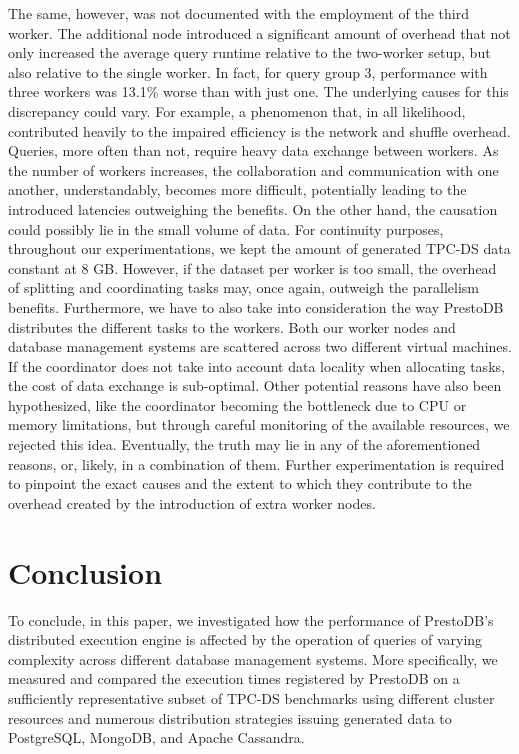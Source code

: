 \documentclass[conference]{IEEEtran}
\begin{document}
The same, however, was not documented with the employment of the third worker. The additional node introduced a significant amount of overhead that not only increased the average query runtime relative to the two-worker setup, but also relative to the single worker. In fact, for query group 3, performance with three workers was 13.1\% worse than with just one. The underlying causes for this discrepancy could vary. For example, a phenomenon that, in all likelihood, contributed heavily to the impaired efficiency is the network and shuffle overhead. Queries, more often than not, require heavy data exchange between workers. As the number of workers increases, the collaboration and communication with one another, understandably, becomes more difficult, potentially leading to the introduced latencies outweighing the benefits. On the other hand, the causation could possibly lie in the small volume of data. For continuity purposes, throughout our experimentations, we kept the amount of generated TPC-DS data constant at 8 GB. However, if the dataset per worker is too small, the overhead of splitting and coordinating tasks may, once again, outweigh the parallelism benefits. Furthermore, we have to also take into consideration the way PrestoDB distributes the different tasks to the workers. Both our worker nodes and database management systems are scattered across two different virtual machines. If the coordinator does not take into account data locality when allocating tasks, the cost of data exchange is sub-optimal. Other potential reasons have also been hypothesized, like the coordinator becoming the bottleneck due to CPU or memory limitations, but through careful monitoring of the available resources, we rejected this idea. Eventually, the truth may lie in any of the aforementioned reasons, or, likely, in a combination of them. Further experimentation is required to pinpoint the exact causes and the extent to which they contribute to the overhead created by the introduction of extra worker nodes.


\section{Conclusion}
To conclude, in this paper, we investigated how the performance of PrestoDB’s distributed execution engine is affected by the operation of queries of varying complexity across different database management systems. More specifically, we measured and compared the execution times registered by PrestoDB on a sufficiently representative subset of TPC-DS benchmarks using different cluster resources and numerous distribution strategies issuing generated data to PostgreSQL, MongoDB, and Apache Cassandra.
\end{document}
